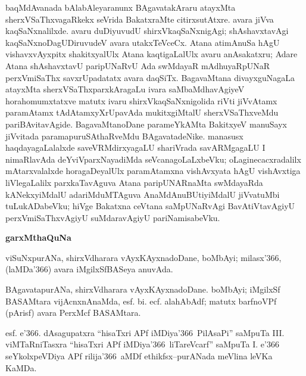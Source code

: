 baqMdAvanada bAlabAleyaranunx BAgavatakAraru atayxMta sherxVSaThxvagaRkekx seVrida BakatxraMte citirxsutAtxre. avara jiVva kaqSaNxnalilxde. avaru duDiyuvudU shirxVkaqSaNxnigAgi; shAshavxtavAgi kaqSaNxnoDagUDiruvudeV avara utakxTeVceCx. Atana atimAnuSa hAgU vishavxvAyxpitx shakitxyalUlx Atana kaqtigaLalUlx avaru anAsakatxru; Adare Atana shAshavxtavU paripUNaRvU Ada swMdayaR mAdhuyaRpUNaR perxVmiSaThx savxrUpadatatx avara daqSiTx. BagavaMtana divayxguNagaLa atayxMta sherxVSaThxparxkAragaLu ivara saMbaMdhavAgiyeV hora\-homumxtatxve matutx ivaru shirxVkaqSaNxnigolida riVti jiVvAtamx paramAtamx tAdAtamxyX\-rUpa\-vAda mukitxgiMtalU sherxVSaThxveMdu pariBAvitavAgide. BagavaMtanoDane parameYkAMta BakitxyeV manuSayx jiVvitada paramapuruSAthaRveMdu BAgavatadeNike. manasusx haqdayagaLalalxde saveVRMdirxyagaLU shariVrada savARMgagaLU I nimaRlavAda deYviV\-parxNayadiMda seVcanagoLaLxbeVku; oLaginecacxradalilx mAtarxvalalxde horagaDeyalUlx para\-mAtamxna vishAvxyata hAgU vishAvxtiga liVlegaLalilx parxkaTavAguva Atana paripUNARnaMta swMdayaRda kANekxyiMdalU adariMduMTAguva AnaMdAnuBUtiyiMdalU jiVvatuMbi tuLukADabeVku; hiVge Bakatxna ceVtana saMpUNaRvAgi BavAtiVtavAgiyU perxVmiSaThxvAgiyU suMdaravAgiyU pariNamisabeVku. 

\theendnotes
{}

\vskip 1cm

\begin{center}
{\Large\bf garxMthaQuNa}
\end{center}

\smallskip
viSuNxpurANa, shirxVdharara vAyxKAyxnadoDane, boMbAyi; milasx\char'366, (laMDa\char'366) avara iMgilxSfBASeya anuvAda.

\smallskip
BAgavatapurANa, shirxVdharara vAyxKAyxnadoDane. boMbAyi; iMgilxSf BASAMtara vijAcnxnAnaMda, esf. bi. ecf. alahAbAdf; matutx barfnoVPf (pArisf) avara PerxMcf BASAMtara.

\smallskip
esf. e\char'366. dAsagupatxra ``hisaTxri APf iMDiya\char'366\ PilAsaPi'' saMpuTa {\rm III.} viMTaRniTasxra ``hisaTxri APf iMDiya\char'366\ liTareVcarf'' saMpuTa {\rm I.} e\char'366 seYkolxpeVDiya APf rilija\char'366\ aMDf ethikfsx--purANada meVlina leVKa KaMDa.
